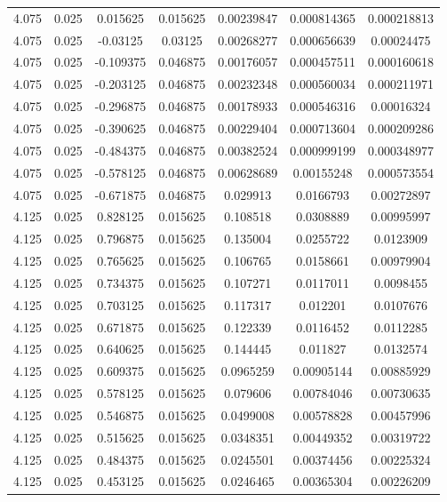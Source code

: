 \begin{flushleft}
\begin{longtable}{ccccccc}
4.075 & 0.025 & 0.015625 & 0.015625 & 0.00239847 & 0.000814365 & 0.000218813  \\ 
4.075 & 0.025 & -0.03125 & 0.03125 & 0.00268277 & 0.000656639 & 0.00024475  \\ 
4.075 & 0.025 & -0.109375 & 0.046875 & 0.00176057 & 0.000457511 & 0.000160618  \\ 
4.075 & 0.025 & -0.203125 & 0.046875 & 0.00232348 & 0.000560034 & 0.000211971  \\ 
4.075 & 0.025 & -0.296875 & 0.046875 & 0.00178933 & 0.000546316 & 0.00016324  \\ 
4.075 & 0.025 & -0.390625 & 0.046875 & 0.00229404 & 0.000713604 & 0.000209286  \\ 
4.075 & 0.025 & -0.484375 & 0.046875 & 0.00382524 & 0.000999199 & 0.000348977  \\ 
4.075 & 0.025 & -0.578125 & 0.046875 & 0.00628689 & 0.00155248 & 0.000573554  \\ 
4.075 & 0.025 & -0.671875 & 0.046875 & 0.029913 & 0.0166793 & 0.00272897  \\ 
4.125 & 0.025 & 0.828125 & 0.015625 & 0.108518 & 0.0308889 & 0.00995997  \\ 
4.125 & 0.025 & 0.796875 & 0.015625 & 0.135004 & 0.0255722 & 0.0123909  \\ 
4.125 & 0.025 & 0.765625 & 0.015625 & 0.106765 & 0.0158661 & 0.00979904  \\ 
4.125 & 0.025 & 0.734375 & 0.015625 & 0.107271 & 0.0117011 & 0.0098455  \\ 
4.125 & 0.025 & 0.703125 & 0.015625 & 0.117317 & 0.012201 & 0.0107676  \\ 
4.125 & 0.025 & 0.671875 & 0.015625 & 0.122339 & 0.0116452 & 0.0112285  \\ 
4.125 & 0.025 & 0.640625 & 0.015625 & 0.144445 & 0.011827 & 0.0132574  \\ 
4.125 & 0.025 & 0.609375 & 0.015625 & 0.0965259 & 0.00905144 & 0.00885929  \\ 
4.125 & 0.025 & 0.578125 & 0.015625 & 0.079606 & 0.00784046 & 0.00730635  \\ 
4.125 & 0.025 & 0.546875 & 0.015625 & 0.0499008 & 0.00578828 & 0.00457996  \\ 
4.125 & 0.025 & 0.515625 & 0.015625 & 0.0348351 & 0.00449352 & 0.00319722  \\ 
4.125 & 0.025 & 0.484375 & 0.015625 & 0.0245501 & 0.00374456 & 0.00225324  \\ 
4.125 & 0.025 & 0.453125 & 0.015625 & 0.0246465 & 0.00365304 & 0.00226209  \\ 

\end{longtable}
\end{flushleft}
